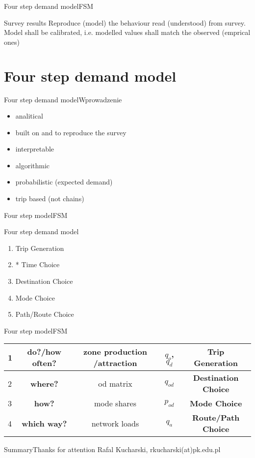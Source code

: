 \documentclass[8pt]{beamer}
\begin{document}
\begin{frame}{Four step demand model}{FSM}
	\begin{block}{Survey results}
		Reproduce (model) the behaviour read (understood) from survey.
		\\
		Model shall be calibrated, i.e. modelled values shall match the observed (emprical ones)
		
	\end{block}	
\end{frame}

\section{Four step demand model}
\begin{frame}{Four step demand model}{Wprowadzenie}
\begin{itemize}
\item analitical
\item built on and to reproduce the survey
\item interpretable
\item algorithmic 
\item probabilistic (expected demand)
\item trip based (not chains)
\end{itemize}
\end{frame}

\begin{frame}{Four step model}{FSM}
	\begin{block}{Four step demand model}
		\begin{enumerate}
		\item Trip Generation
		\item * Time Choice
		\item Destination Choice
		\item Mode Choice
		\item Path/Route Choice
		\end{enumerate}	
	\end{block}	
\end{frame}


\begin{frame}{Four step model}{FSM}
\begin{table}[]
\begin{tabular}{l|c|c|c|c}
1 & \textbf{do?/how often?} &  zone production /attraction & $q_o$, $q_d$ & \textbf{Trip Generation}\\ \hline 
2 & \textbf{where?} &  od matrix & $q_{od}$ & \textbf{Destination Choice}\\ \hline 
3 & \textbf{how?} &  mode shares  & $p_{od}$ & \textbf{Mode Choice}\\ \hline 
4 & \textbf{which way?} &  network loads & $q_a$ & \textbf{Route/Path Choice}\\ \hline 
\end{tabular}
\end{table}
\end{frame}




\begin{frame}{Summary}{Thanks for attention}
Rafal Kucharski, rkucharski(at)pk.edu.pl
\end{frame}
\end{document}
